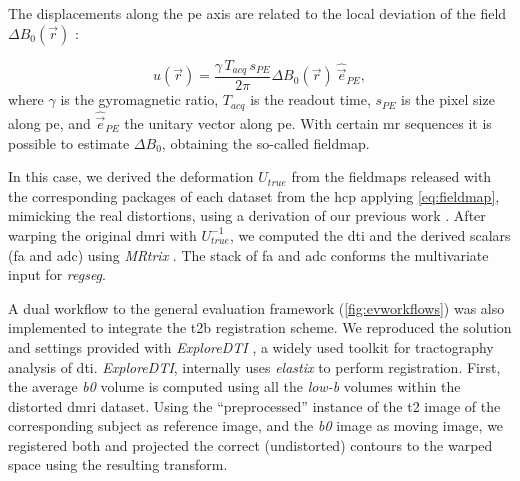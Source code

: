 The displacements along the \gls*{pe} axis are related to the local deviation of the
  field $\Delta B_0(\vec{r})$ \citep{jezzard_correction_1995}:

  \begin{equation}
  u(\vec{r}) = \frac{\gamma \, T_{acq}\, s_{PE}}{2\pi}\Delta B_0(\vec{r}) \: \hat{\vec{e}}_{PE},
  \label{eq:fieldmap}
  \end{equation}
%
where $\gamma$ is the gyromagnetic ratio, $T_{acq}$ is the readout time,
  $s_{PE}$ is the pixel size along \gls*{pe}, and $\hat{\vec{e}}_{PE}$ the unitary
  vector along \gls*{pe}.
With certain \gls*{mr} sequences it is possible to estimate $\Delta B_0$, obtaining
  the so-called fieldmap.

In this case, we derived the deformation $U_{true}$ from the fieldmaps released with
  the corresponding packages of each dataset from the \gls*{hcp} applying \eqref{eq:fieldmap},
  mimicking the real distortions, using a derivation of our previous work
  \citep{esteban_simulationbased_2014}.
After warping the original \gls*{dmri} with $U_{true}^{-1}$, we computed the \gls*{dti} and
  the derived scalars (\gls*{fa} and \gls*{adc}) using \emph{MRtrix} \citep{tournier_mrtrix_2012}.
The stack of \gls*{fa} and \gls*{adc} conforms the multivariate input for \emph{regseg}.

A dual workflow to the general evaluation framework (\autoref{fig:evworkflows})
  was also implemented to integrate the \gls*{t2b} registration scheme.
We reproduced the solution and settings provided with \emph{ExploreDTI}
  \citep{leemans_exploredti_2009}, a widely used toolkit for tractography analysis of
  \gls*{dti}.
\emph{ExploreDTI}, internally uses \emph{elastix} \citep{klein_elastix_2010} to
  perform registration.
First, the average \emph{b0} volume is computed using all the \emph{low-b} volumes within
  the distorted \gls*{dmri} dataset.
Using the ``preprocessed'' instance of the \gls*{t2} image of the corresponding subject as
  reference image, and the \emph{b0} image as moving image, we registered both and
  projected the correct (undistorted) contours to the warped space using the resulting
  transform.